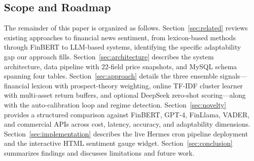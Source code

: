 \subsection{Scope and Roadmap}

The remainder of this paper is organized as follows. Section~\ref{sec:related} reviews existing approaches to financial news sentiment, from lexicon-based methods through FinBERT to LLM-based systems, identifying the specific adaptability gap our approach fills. Section~\ref{sec:architecture} describes the system architecture, data pipeline with 22-field price snapshots, and MySQL schema spanning four tables. Section~\ref{sec:approach} details the three ensemble signals---financial lexicon with prospect-theory weighting, online TF-IDF cluster learner with multi-asset return buffers, and optional DeepSeek zero-shot scoring---along with the auto-calibration loop and regime detection. Section~\ref{sec:novelty} provides a structured comparison against FinBERT, GPT-4, FinLlama, VADER, and commercial APIs across cost, latency, accuracy, and adaptability dimensions. Section~\ref{sec:implementation} describes the live Hermes cron pipeline deployment and the interactive HTML sentiment gauge widget. Section~\ref{sec:conclusion} summarizes findings and discusses limitations and future work.
